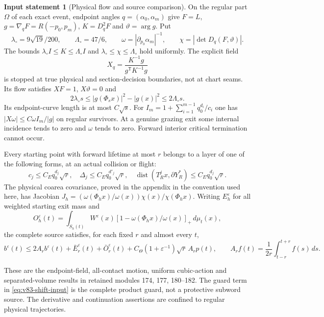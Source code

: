 \documentclass[11pt,reqno]{amsart}
\numberwithin{equation}{section}
\theoremstyle{definition}
\newtheorem{inputstatement}[theorem]{Input statement}
\theoremstyle{remark}\newtheorem{remark}[theorem]{Remark}
\begin{document}
\begin{inputstatement}[Physical flow and source comparison]
\label{input:v83-geometric}
On the regular part $\Omega$ of each exact event, endpoint angles
$q=(\alpha_0,\alpha_m)$ give $F=L$, $g=\nabla_qF=R(-p_0,p_m)$,
$K=D_q^2F$ and $\vartheta=\arg g$. Put
\[
 \lambda_\circ=9\sqrt{19}/200,\qquad \Lambda_\circ=47/6,\qquad
 \omega=|\partial_{p_0}\alpha_m|^{-1},\qquad
 \chi=|\det D_q(F,\vartheta)|.
\]
The bounds $\lambda_\circ I\le K\le\Lambda_\circ I$ and
$\lambda_\circ\le\chi\le\Lambda_\circ$ hold uniformly.
The explicit field
\[
 X_q=\frac{K^{-1}g}{g^{\mathsf T}K^{-1}g}
\]
is stopped at true physical and section-decision boundaries, not at
chart seams. Its flow satisfies $XF=1$, $X\vartheta=0$ and
\begin{equation}\label{eq:v83-radial-input}
 2\lambda_\circ s\le |g(\Phi_sx)|^2-|g(x)|^2
                                      \le2\Lambda_\circ s.
\end{equation}
Its endpoint-curve length is at most $C\sqrt s$. For
$I_m=1+\sum_{i=1}^{m-1}q_0^{d_i}/c_i$ one has
$|X\omega|\le C\omega I_m/|g|$ on regular survivors. At a genuine
grazing exit some internal incidence tends to zero and $\omega$ tends
to zero. Forward interior critical termination cannot occur.

Every starting point with forward lifetime at most $r$ belongs to a
layer of one of the following forms, at an actual collision or flight:
\begin{equation}\label{eq:v83-layer-input}
 c_j\le C_Eq_0^{d_j}\sqrt r,\quad
 \Delta_j\le C_Eq_0^{d'_j}\sqrt r,\quad
 \operatorname{dist}(T_R^jx,\partial Y_R^*)\le C_Eq_0^{d_j}\sqrt r.
\end{equation}
The physical coarea covariance, proved in the appendix in the convention
used here, has Jacobian $J_h=(\omega(\Phi_hx)/\omega(x))\chi(x)/\chi(\Phi_hx)$.
Writing $E_h^\varepsilon$ for all weighted starting exit mass and
\[
 O_h^\varepsilon(t)=\int_{S_h(t)} W^\varepsilon(x)
            [1-\omega(\Phi_hx)/\omega(x)]_+\,d\mu_t(x),
\]
the complete source satisfies, for each fixed $r$ and almost every $t$,
\begin{equation}\label{eq:v83-shift-input}
 b^\varepsilon(t)\le2A_rb^\varepsilon(t)+\bar E_r^\varepsilon(t)
       +\bar O_r^\varepsilon(t)
       +C_\Theta(1+\varepsilon^{-1})\sqrt r\,A_rp(t),
 \qquad A_rf(t)=\frac1{2r}\int_{t-r}^{t+r}f(s)\,ds.
\end{equation}
\end{inputstatement}
These are the endpoint-field, all-contact motion, uniform cubic-action
and separated-volume results in retained modules 174, 177, 180--182.
The guard term in \eqref{eq:v83-shift-input} is the complete product
guard, not a protective subword source. The derivative and continuation
assertions are confined to regular physical trajectories.
\end{document}
